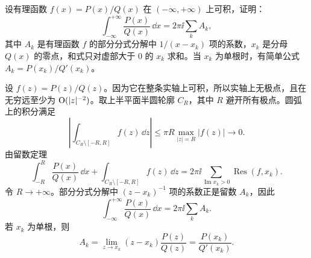 \begin{xreferenceproblem}[7]
设有理函数 $f(x)=P(x)/Q(x)$ 在 $(-\infty,+\infty)$ 上可积，证明：
  \[
    \int_{-\infty}^{+\infty}\frac{P(x)}{Q(x)}\,\dd x=2\pi\ii\sum_k A_k,
  \]
  其中 $A_k$ 是有理函数 $f$ 的部分分式分解中 $1/(x-x_k)$ 项的系数，$x_k$ 是分母 $Q(x)$ 的零点，和式只对虚部大于 0 的 $x_k$ 求和。当 $x_k$ 为单根时，有简单公式 $A_k=P(x_k)/Q'(x_k)$。
\end{xreferenceproblem}
\begin{xsolution}
设 $f(z)=P(z)/Q(z)$。因为它在整条实轴上可积，所以实轴上无极点，且在无穷远至少为 $\mathrm{O}(|z|^{-2})$。取上半平面半圆轮廓 $C_R$，其中 $R$ 避开所有极点。圆弧上的积分满足
\[
  \left|\int_{C_R\setminus[-R,R]}f(z)\,\dd z\right|
  \leq \pi R\max_{|z|=R}|f(z)|\to0.
\]
由留数定理
\[
  \int_{-R}^{R}\frac{P(x)}{Q(x)}\,\dd x
  +\int_{C_R\setminus[-R,R]}f(z)\,\dd z
  =2\pi\ii\sum_{\operatorname{Im}x_k>0}\operatorname{Res}(f,x_k).
\]
令 $R\to+\infty$。部分分式分解中 $(z-x_k)^{-1}$ 项的系数正是留数 $A_k$，因此
\[
  \boxed{\int_{-\infty}^{+\infty}\frac{P(x)}{Q(x)}\,\dd x
  =2\pi\ii\sum_kA_k}.
\]
若 $x_k$ 为单根，则
\[
  A_k=\lim_{z\to x_k}(z-x_k)\frac{P(z)}{Q(z)}
  =\boxed{\frac{P(x_k)}{Q'(x_k)}}.
\]
\end{xsolution}


